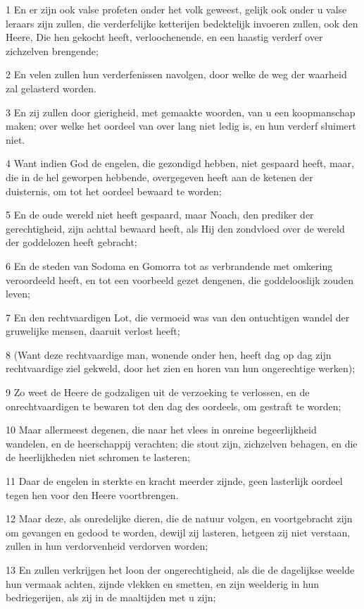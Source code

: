 \par 1 En er zijn ook valse profeten onder het volk geweest, gelijk ook onder u valse leraars zijn zullen, die verderfelijke ketterijen bedektelijk invoeren zullen, ook den Heere, Die hen gekocht heeft, verloochenende, en een haastig verderf over zichzelven brengende;
\par 2 En velen zullen hun verderfenissen navolgen, door welke de weg der waarheid zal gelasterd worden.
\par 3 En zij zullen door gierigheid, met gemaakte woorden, van u een koopmanschap maken; over welke het oordeel van over lang niet ledig is, en hun verderf sluimert niet.
\par 4 Want indien God de engelen, die gezondigd hebben, niet gespaard heeft, maar, die in de hel geworpen hebbende, overgegeven heeft aan de ketenen der duisternis, om tot het oordeel bewaard te worden;
\par 5 En de oude wereld niet heeft gespaard, maar Noach, den prediker der gerechtigheid, zijn achttal bewaard heeft, als Hij den zondvloed over de wereld der goddelozen heeft gebracht;
\par 6 En de steden van Sodoma en Gomorra tot as verbrandende met omkering veroordeeld heeft, en tot een voorbeeld gezet dengenen, die goddelooslijk zouden leven;
\par 7 En den rechtvaardigen Lot, die vermoeid was van den ontuchtigen wandel der gruwelijke mensen, daaruit verlost heeft;
\par 8 (Want deze rechtvaardige man, wonende onder hen, heeft dag op dag zijn rechtvaardige ziel gekweld, door het zien en horen van hun ongerechtige werken);
\par 9 Zo weet de Heere de godzaligen uit de verzoeking te verlossen, en de onrechtvaardigen te bewaren tot den dag des oordeels, om gestraft te worden;
\par 10 Maar allermeest degenen, die naar het vlees in onreine begeerlijkheid wandelen, en de heerschappij verachten; die stout zijn, zichzelven behagen, en die de heerlijkheden niet schromen te lasteren;
\par 11 Daar de engelen in sterkte en kracht meerder zijnde, geen lasterlijk oordeel tegen hen voor den Heere voortbrengen.
\par 12 Maar deze, als onredelijke dieren, die de natuur volgen, en voortgebracht zijn om gevangen en gedood te worden, dewijl zij lasteren, hetgeen zij niet verstaan, zullen in hun verdorvenheid verdorven worden;
\par 13 En zullen verkrijgen het loon der ongerechtigheid, als die de dagelijkse weelde hun vermaak achten, zijnde vlekken en smetten, en zijn weelderig in hun bedriegerijen, als zij in de maaltijden met u zijn;
